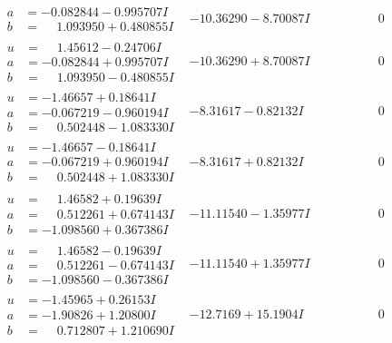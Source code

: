 \documentclass[1p]{elsarticle_modified}
\theoremstyle{definition}
\begin{document}
$$\begin{array}{c|c|c}
\begin{aligned}
a &= -0.082844 - 0.995707 I \\
b &= \phantom{-}1.093950 + 0.480855 I\end{aligned}
 & -10.36290 - 8.70087 I & \phantom{-0.000000 } 0 \\ \hline\begin{aligned}
u &= \phantom{-}1.45612 - 0.24706 I \\
a &= -0.082844 + 0.995707 I \\
b &= \phantom{-}1.093950 - 0.480855 I\end{aligned}
 & -10.36290 + 8.70087 I & \phantom{-0.000000 } 0 \\ \hline\begin{aligned}
u &= -1.46657 + 0.18641 I \\
a &= -0.067219 - 0.960194 I \\
b &= \phantom{-}0.502448 - 1.083330 I\end{aligned}
 & -8.31617 - 0.82132 I & \phantom{-0.000000 } 0 \\ \hline\begin{aligned}
u &= -1.46657 - 0.18641 I \\
a &= -0.067219 + 0.960194 I \\
b &= \phantom{-}0.502448 + 1.083330 I\end{aligned}
 & -8.31617 + 0.82132 I & \phantom{-0.000000 } 0 \\ \hline\begin{aligned}
u &= \phantom{-}1.46582 + 0.19639 I \\
a &= \phantom{-}0.512261 + 0.674143 I \\
b &= -1.098560 + 0.367386 I\end{aligned}
 & -11.11540 - 1.35977 I & \phantom{-0.000000 } 0 \\ \hline\begin{aligned}
u &= \phantom{-}1.46582 - 0.19639 I \\
a &= \phantom{-}0.512261 - 0.674143 I \\
b &= -1.098560 - 0.367386 I\end{aligned}
 & -11.11540 + 1.35977 I & \phantom{-0.000000 } 0 \\ \hline\begin{aligned}
u &= -1.45965 + 0.26153 I \\
a &= -1.90826 + 1.20800 I \\
b &= \phantom{-}0.712807 + 1.210690 I\end{aligned}
 & -12.7169 + 15.1904 I & \phantom{-0.000000 } 0 \\ \hline\begin{aligned}

\end{aligned}
\end{array}$$
\end{document}
